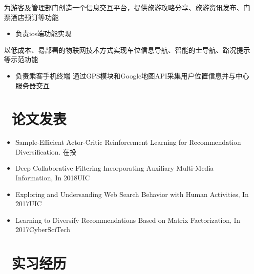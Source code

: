 \documentclass{resume}
\begin{document}
\begin{onehalfspacing}
为游客及管理部门创造一个信息交互平台，提供旅游攻略分享、旅游资讯发布、门票酒店预订等功能
\begin{itemize}
	\item 负责ios端功能实现
\end{itemize}
\end{onehalfspacing}
\begin{onehalfspacing}
以低成本、易部署的物联网技术方式实现车位信息导航、智能的士导航、路况提示等示范功能
\begin{itemize}
  \item 负责乘客手机终端  通过GPS模块和Google地图API采集用户位置信息并与中心服务器交互
\end{itemize}
\end{onehalfspacing}

\section{\faBook\ 论文发表}
\begin{itemize}
\item Sample-Efficient Actor-Critic Reinforcement Learning for Recommendation Diversification. 在投
\item Deep Collaborative Filtering Incorporating Auxiliary Multi-Media Information, In 2018UIC
\item Exploring and Undersanding Web Search Behavior with Human Activities, In 2017UIC
\item Learning to Diversify Recommendations Based on Matrix Factorization, In 2017CyberSciTech
\end{itemize}

\section{\faUsers\ 实习经历}
\end{document}
